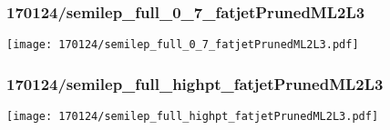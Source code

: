 \begin{frame}
   \frametitle{\small 170124/semilep\_full\_0\_7\_fatjetPrunedML2L3}
   \centering
   \texttt{[image: 170124/semilep\_full\_0\_7\_fatjetPrunedML2L3.pdf]}
\end{frame}

\begin{frame}
   \frametitle{\small 170124/semilep\_full\_highpt\_fatjetPrunedML2L3}
   \centering
   \texttt{[image: 170124/semilep\_full\_highpt\_fatjetPrunedML2L3.pdf]}
\end{frame}

